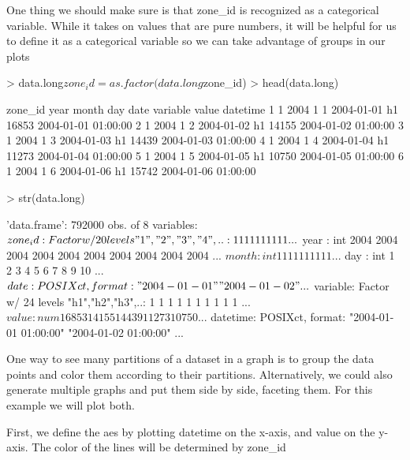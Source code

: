 \documentclass{article}
\begin{document}
One thing we should make sure is that zone\_id is recognized as a categorical
variable.  While it takes on values that are pure numbers, it will be helpful
for us to define it as a categorical variable so we can take advantage of groups
in our plots

\begin{Schunk}
\begin{Sinput}
> data.long$zone_id = as.factor(data.long$zone_id)
> head(data.long)
\end{Sinput}
\begin{Soutput}
  zone_id year month day       date variable value            datetime
1       1 2004     1   1 2004-01-01       h1 16853 2004-01-01 01:00:00
2       1 2004     1   2 2004-01-02       h1 14155 2004-01-02 01:00:00
3       1 2004     1   3 2004-01-03       h1 14439 2004-01-03 01:00:00
4       1 2004     1   4 2004-01-04       h1 11273 2004-01-04 01:00:00
5       1 2004     1   5 2004-01-05       h1 10750 2004-01-05 01:00:00
6       1 2004     1   6 2004-01-06       h1 15742 2004-01-06 01:00:00
\end{Soutput}
\begin{Sinput}
> str(data.long)
\end{Sinput}
\begin{Soutput}
'data.frame':	792000 obs. of  8 variables:
 $ zone_id : Factor w/ 20 levels "1","2","3","4",..: 1 1 1 1 1 1 1 1 1 1 ...
 $ year    : int  2004 2004 2004 2004 2004 2004 2004 2004 2004 2004 ...
 $ month   : int  1 1 1 1 1 1 1 1 1 1 ...
 $ day     : int  1 2 3 4 5 6 7 8 9 10 ...
 $ date    : POSIXct, format: "2004-01-01" "2004-01-02" ...
 $ variable: Factor w/ 24 levels "h1","h2","h3",..: 1 1 1 1 1 1 1 1 1 1 ...
 $ value   : num  16853 14155 14439 11273 10750 ...
 $ datetime: POSIXct, format: "2004-01-01 01:00:00" "2004-01-02 01:00:00" ...
\end{Soutput}
\end{Schunk}

One way to see many partitions of a dataset in a graph is to group the
data points and color them according to their partitions.  Alternatively, we
could also generate multiple graphs and put them side by side, faceting them.
For this example we will plot both.

First, we define the aes by plotting datetime on the x-axis, and value on the
y-axis.  The color of the lines will be determined by zone\_id
\end{document}
